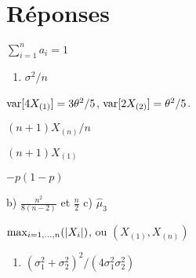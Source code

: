 \bigskip
\section*{Réponses}

\begin{reponse}{3.2}
    $\sum_{i=1}^n a_i = 1$
  
\end{reponse}
\begin{reponse}{3.3}
    \begin{enumerate}
    \item $\sigma^2/n$
    \end{enumerate}
  
\end{reponse}
\begin{reponse}{3.4}
    $\mathrm{var} [ 4X_{(1)} ] = 3 \theta^2/5$, $\mathrm{var} [ 2X_{(2)} ] = \theta^2/5$.
  
\end{reponse}
\begin{reponse}{3.5}
    \begin{inparaenum}
    \item $(n + 1) X_{(n)}/n$
    \item $(n + 1) X_{(1)}$
    \end{inparaenum}
  
\end{reponse}
\begin{reponse}{3.6}
    $-p (1 - p)$
  
\end{reponse}
\begin{reponse}{3.9}
b)  $\frac{n^2}{8(n-2)}$ et $\frac{n}{2}$ \quad c) ${\hat \mu}_3$
\end{reponse}
\begin{reponse}{3.12}
    $\max_{i = 1, \dots, n}(\lvert X_i \rvert)$, ou $(X_{(1)}, X_{(n)})$
  
\end{reponse}
\begin{reponse}{3.20}
    \begin{enumerate}
      \addtocounter{enumi}{2}
    \item $(\sigma_1^2 + \sigma_2^2)^2/(4 \sigma_1^2 \sigma_2^2)$
    \end{enumerate}
  
\end{reponse}
